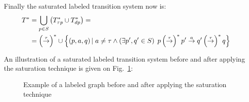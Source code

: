 Finally the saturated labeled transition system now is:
\begin{align*}
	T^{*} &=\bigcup_{p\in \mathit{S}}\left(T^{*}_{\mathit{\tau p}}\cup T^{*}_{dp}\right)=\\
	&=\left(\stackrel{\tau}{\rightarrow}\right)^{*}\cup\left\{\left(p,a,q\right)|\hspace{1mm}a\neq\tau\wedge\left(\exists p',q'\in S\right)\hspace{1mm} p\left(\stackrel{\tau}{\rightarrow}\right)^{*}p'\stackrel{a}{\rightarrow}q'\left(\stackrel{\tau}{\rightarrow}\right)^{*}q\right\}
\end{align*}

An illustration of a saturated labeled transition system before and after applying the saturation technique is given on Fig.~\ref{fig:saturation_example}:



\begin{figure}[h]
\centering
{}
\caption{Example of a labeled graph before and after applying the saturation technique}
\label{fig:saturation_example}
\end{figure}

